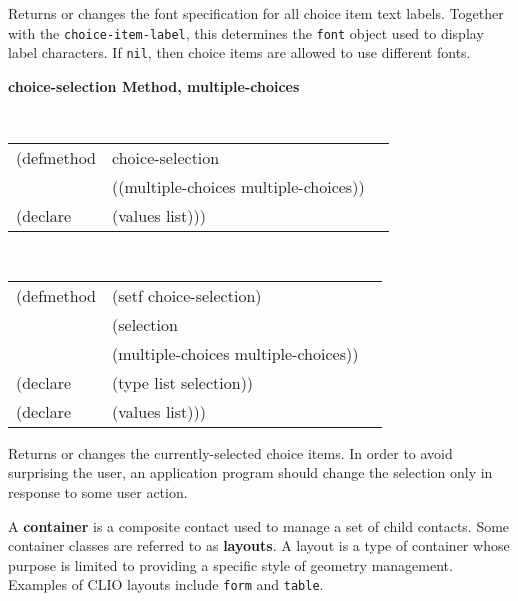 \begin{flushright} \parbox[t]{6.125in}{
Returns or changes the font specification for all choice item text labels.
Together
with the {\tt choice-item-label}, this determines the {\tt font}
object used to display label characters. If {\tt nil}, then choice items are
allowed to use different fonts.


}\end{flushright}


{\samepage
{\large {\bf choice-selection \hfill Method, multiple-choices}}
\begin{flushright} \parbox[t]{6.125in}{
\tt
\begin{tabular}{lll}
\raggedright
(defmethod & choice-selection & \\
& ((multiple-choices  multiple-choices)) \\
(declare &(values list)))
\end{tabular}
\rm

}\end{flushright}}

{\samepage
\begin{flushright} \parbox[t]{6.125in}{
\tt
\begin{tabular}{lll}
\raggedright
(defmethod & (setf choice-selection) & \\
         & (selection \\
         & (multiple-choices multiple-choices)) \\
(declare &(type list  selection))\\
(declare & (values list)))
\end{tabular}
\rm
}
\end{flushright}}



\begin{flushright} \parbox[t]{6.125in}{
Returns or changes the currently-selected choice items. In order to
avoid surprising the user, an application program should change the selection only in
response to some user action.


}\end{flushright}






A {\bf container} is a composite contact used to manage a set
of child contacts.  Some container classes are referred to as {\bf layouts}.
 A layout is a type of container whose purpose is limited to
providing a specific style of geometry management.  Examples of CLIO layouts
include {\tt form} and {\tt table}.

